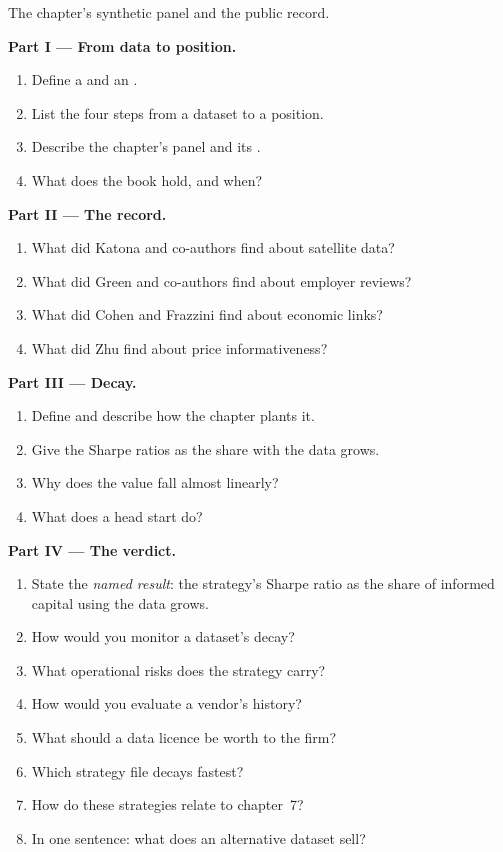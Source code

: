 \begin{problem}\label{pb:s1:alternative-data-strategies:1}
The chapter's synthetic panel and the public record.

\medskip\noindent\textbf{Part I --- From data to position.}
\begin{enumerate}
\item Define a  and an .
\item List the four steps from a dataset to a position.
\item Describe the chapter's panel and its .
\item What does the book hold, and when?
\end{enumerate}

\medskip\noindent\textbf{Part II --- The record.}
\begin{enumerate}[resume]
\item What did Katona and co-authors find about satellite data?
\item What did Green and co-authors find about employer reviews?
\item What did Cohen and Frazzini find about economic links?
\item What did Zhu find about price informativeness?
\end{enumerate}

\medskip\noindent\textbf{Part III --- Decay.}
\begin{enumerate}[resume]
\item Define  and describe how the chapter plants it.
\item Give the Sharpe ratios as the share with the data grows.
\item Why does the value fall almost linearly?
\item What does a head start do?
\end{enumerate}

\medskip\noindent\textbf{Part IV --- The verdict.}
\begin{enumerate}[resume]
\item State the \emph{named result}: the  strategy's Sharpe ratio as the share of informed capital using the data grows.
\item How would you monitor a dataset's decay?
\item What operational risks does the strategy carry?
\item How would you evaluate a vendor's history?
\item What should a data licence be worth to the firm?
\item Which strategy file decays fastest?
\item How do these strategies relate to chapter~7?
\item In one sentence: what does an alternative dataset sell?
\end{enumerate}
\end{problem}

